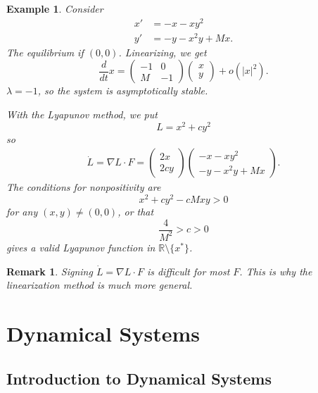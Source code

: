 \documentclass{tufte-handout}
\newcommand*\R{\mathbb{R}}
\newtheorem{rmk}[thm]{Remark}
\newtheorem{ex}[thm]{Example}
\theoremstyle{definition}
\begin{document}
\begin{ex}
	Consider
	\begin{align*}
		x' &= -x-xy^2  \\
		y' &= -y -x^2y + Mx
	.\end{align*} The equilibrium if $(0,0)$.
	Linearizing, we get \[
		\frac{d}{dt}x = \begin{pmatrix}
		-1 & 0 \\
		M & -1
		\end{pmatrix} \begin{pmatrix}
		x  \\
		y
		\end{pmatrix}  + o\left( \left| x \right|^2 \right)
	.\] $\lambda = -1$, so the system is asymptotically stable.

	With the Lyapunov method, we put \[
		L = x^2 + cy^2
	\] so
	\begin{align*}
		\dot{L} = \nabla L \cdot F = \begin{pmatrix}
		2x \\
		2cy
		\end{pmatrix} \begin{pmatrix}
		-x-xy^2 \\
		-y - x^2y + Mx
		\end{pmatrix} 
	.\end{align*}
	The conditions for nonpositivity are \[
		x^2 + cy^2 - cMxy > 0
	\] for any $(x,y) \ne (0,0)$, or that \[
		\frac{4}{M^2} > c > 0
	\] gives a valid Lyapunov function in $\R \setminus \{x^*\}$.
\end{ex}

\begin{rmk}
	Signing $\dot{L} = \nabla L \cdot F$ is difficult for most $F$. This is why the linearization method is much more general.
\end{rmk}

\section{Dynamical Systems}

\subsection{Introduction to Dynamical Systems}
\end{document}
